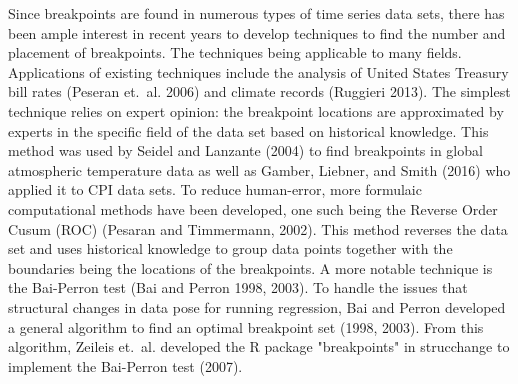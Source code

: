 \documentclass[submit]{smj}
\begin{document}
Since breakpoints are found in numerous types of time series data sets, there has been ample interest in recent years to develop techniques to find the number and placement of breakpoints. The techniques being applicable to many fields. Applications of existing techniques include the analysis of United States Treasury bill rates (Peseran et.~al. 2006) and climate records (Ruggieri 2013).  The simplest technique relies on expert opinion: the breakpoint locations are approximated by experts in the specific field of the data set based on historical knowledge. This method was used by Seidel and Lanzante (2004) to find breakpoints in global atmospheric temperature data as well as Gamber, Liebner, and Smith (2016) who applied it to CPI data sets. To reduce human-error, more formulaic computational methods have been developed, one such being the Reverse Order Cusum (ROC) (Pesaran and Timmermann, 2002).  This method reverses the data set and uses historical knowledge to group data points together with the boundaries being the locations of the breakpoints. A more notable technique is the Bai-Perron test (Bai and Perron 1998, 2003). To handle the issues that structural changes in data pose for running regression, Bai and Perron developed a general algorithm to find an optimal breakpoint set (1998, 2003). From this algorithm, Zeileis et.~al. developed the R package "breakpoints" in strucchange to implement the Bai-Perron test (2007).  
\end{document}
